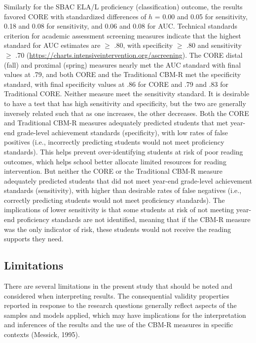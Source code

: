 \documentclass[
  english,
  man, fleqn, noextraspace]{apa6}
\begin{document}
Similarly for the SBAC ELA/L proficiency (classification) outcome, the results favored CORE with standardized differences of \(h\) = 0.00 and 0.05 for sensitivity, 0.18 and 0.08 for sensitivity, and 0.06 and 0.08 for AUC. Technical standards criterion for academic assessment screening measures indicate that the highest standard for AUC estimates are \(\geq\) .80, with specificity \(\geq\) .80 and sensitivity \(\geq\) .70 (\url{https://charts.intensiveintervention.org/ascreening}). The CORE distal (fall) and proximal (spring) measures nearly met the AUC standard with final values at .79, and both CORE and the Traditional CBM-R met the specificity standard, with final specificity values at .86 for CORE and .79 and .83 for Traditional CORE. Neither measure meet the sensitivity standard. It is desirable to have a test that has high sensitivity and specificity, but the two are generally inversely related such that as one increases, the other decreases. Both the CORE and Traditional CBM-R measures adequately predicted students that met year-end grade-level achievement standards (specificity), with low rates of false positives (i.e., incorrectly predicting students would not meet proficiency standards). This helps prevent over-identifying students at risk of poor reading outcomes, which helps school better allocate limited resources for reading intervention. But neither the CORE or the Traditional CBM-R measure adequately predicted students that did not meet year-end grade-level achievement standards (sensitivity), with higher than desirable rates of false negatives (i.e., correctly predicting students would not meet proficiency standards). The implications of lower sensitivity is that some students at risk of not meeting year-end proficiency standards are not identified, meaning that if the CBM-R measure was the only indicator of risk, these students would not receive the reading supports they need.

\hypertarget{limitations}{%
\subsection{Limitations}\label{limitations}}

There are several limitations in the present study that should be noted and considered when interpreting results. The consequential validity properties reported in response to the research questions generally reflect aspects of the samples and models applied, which may have implications for the interpretation and inferences of the results and the use of the CBM-R measures in specific contexts (Messick, 1995).
\end{document}
